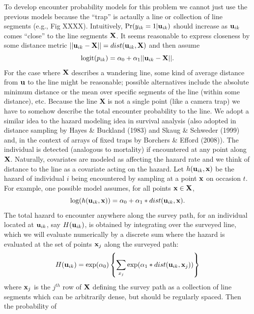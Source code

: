To develop encounter probability models for this problem we cannot
just use the previous models because the ``trap'' is actaully a line
or collection of line segments (e.g., Fig XXXX).
Intuitively, $\Pr(y_{ik}=1|{\bf u}_{ik})$ should increase as ${\bf
  u}_{ik}$ comes ``close'' to the line segments ${\bf X}$. It seems
reasonable to express closeness by some distance metric $|| {\bf
  u}_{ik} - {\bf X} || = dist( {\bf u}_{ik}, {\bf X})$ and then assume
\[
\mbox{logit}(p_{ik}) = \alpha_{0} + \alpha_{1} || {\bf u}_{ik} - {\bf X} ||.
\]
For the case where ${\bf X}$ describes a wandering line, some
kind of average distance from ${\bf u}$ to the line
might be reasonable; possible alternatives include the absolute
minimum distance or the mean over specific segments
of the line (within some distance), etc.
Because the line {\bf X} is not a single point (like a camera trap) we have to somehow describe
the total encounter probability to the line. We adopt a similar idea
to the hazard modeling idea in survival analysis (also adopted in
distance sampling by Hayes \& Buckland (1983) and Skaug \& Schweder
(1999) and, in the context of arrays of fixed traps by Borchers \&
Efford (2008)).  The individual is detected (analogous to mortality)
if encountered at any point along ${\bf X}$. Naturally, covariates are
modeled as affecting the hazard rate and we think of distance to the
line as a covariate acting on the hazard. Let $h({\bf u}_{ik},{\bf
  x})$ be the hazard of individual $i$ being encountered by sampling
at a point ${\bf x}$ on occasion $t$.  For example, one possible model
assumes, for all points ${\bf x} \in {\bf X}$,
\begin{equation}
\log(h({\bf u}_{ik},{\bf x})) = \alpha_{0} + \alpha_{1}*dist({\bf u}_{ik},{\bf x}).
\label{eq.hazard}
\end{equation}
The total hazard to encounter anywhere along the survey path, for an
individual located at ${\bf u}_{ik}$, say $H({\bf u}_{ik})$, is
obtained by integrating over the surveyed line, which we will evaluate
numerically by a discrete sum where the hazard is evaluated at the set
of points ${\bf x}_{j}$ along the surveyed path:
\begin{equation}
H({\bf u}_{ik}) =  \exp(\alpha_{0}) \left\{ \sum_{x_{j}}  \exp(\alpha_{1}*dist({\bf
    u}_{ik},{\bf x}_{j})) \right\}
\label{eq.totalhazard}
\end{equation}
where ${\bf x}_{j}$ is the $j^{th}$ row of ${\bf X}$ defining the
survey path as a collection of line segments which can be arbitrarily
dense, but should be regularly spaced.  Then the probability of
